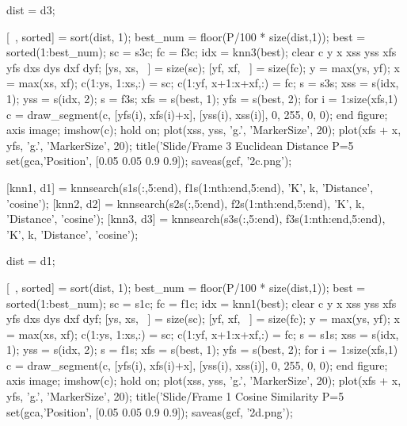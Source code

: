 dist = d3;

[~, sorted] = sort(dist, 1);
best_num = floor(P/100 * size(dist,1));
best = sorted(1:best_num);
sc = s3c;
fc = f3c;
idx = knn3(best);
clear c y x xss yss xfs yfs dxs dys dxf dyf;
[ys, xs, ~] = size(sc);
[yf, xf, ~] = size(fc);
y = max(ys, yf);
x = max(xs, xf);
c(1:ys, 1:xs,:) = sc;
c(1:yf, x+1:x+xf,:) = fc;
s = s3s;
xss = s(idx, 1);
yss = s(idx, 2);
s = f3s;
xfs = s(best, 1);
yfs = s(best, 2);
for i = 1:size(xfs,1)
    c = draw_segment(c, [yfs(i), xfs(i)+x], [yss(i), xss(i)], 0, 255, 0, 0);
end
figure;
axis image;
imshow(c);
hold on;
plot(xss, yss, 'g.', 'MarkerSize', 20);
plot(xfs + x, yfs, 'g.', 'MarkerSize', 20);
title('Slide/Frame 3 Euclidean Distance P=5%
set(gca,'Position', [0.05 0.05 0.9 0.9]);
saveas(gcf, '2c.png');

[knn1, d1] = knnsearch(s1s(:,5:end), f1s(1:nth:end,5:end), 'K', k, 'Distance', 'cosine');
[knn2, d2] = knnsearch(s2s(:,5:end), f2s(1:nth:end,5:end), 'K', k, 'Distance', 'cosine');
[knn3, d3] = knnsearch(s3s(:,5:end), f3s(1:nth:end,5:end), 'K', k, 'Distance', 'cosine');

dist = d1;

[~, sorted] = sort(dist, 1);
best_num = floor(P/100 * size(dist,1));
best = sorted(1:best_num);
sc = s1c;
fc = f1c;
idx = knn1(best);
clear c y x xss yss xfs yfs dxs dys dxf dyf;
[ys, xs, ~] = size(sc);
[yf, xf, ~] = size(fc);
y = max(ys, yf);
x = max(xs, xf);
c(1:ys, 1:xs,:) = sc;
c(1:yf, x+1:x+xf,:) = fc;
s = s1s;
xss = s(idx, 1);
yss = s(idx, 2);
s = f1s;
xfs = s(best, 1);
yfs = s(best, 2);
for i = 1:size(xfs,1)
    c = draw_segment(c, [yfs(i), xfs(i)+x], [yss(i), xss(i)], 0, 255, 0, 0);
end
figure;
axis image;
imshow(c);
hold on;
plot(xss, yss, 'g.', 'MarkerSize', 20);
plot(xfs + x, yfs, 'g.', 'MarkerSize', 20);
title('Slide/Frame 1 Cosine Similarity P=5%
set(gca,'Position', [0.05 0.05 0.9 0.9]);
saveas(gcf, '2d.png');

